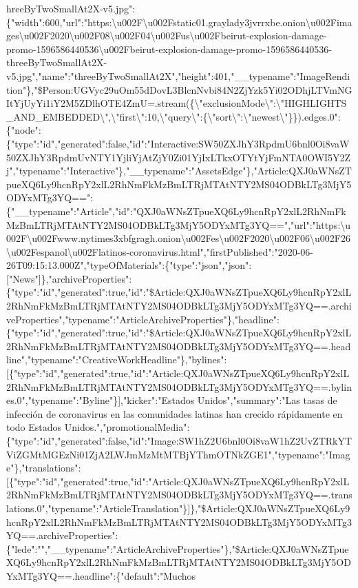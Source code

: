 hreeByTwoSmallAt2X-v5.jpg":\{"width":600,"url":"https:\textbackslash{}u002F\textbackslash{}u002Fstatic01.graylady3jvrrxbe.onion\textbackslash{}u002Fimages\textbackslash{}u002F2020\textbackslash{}u002F08\textbackslash{}u002F04\textbackslash{}u002Fus\textbackslash{}u002Fbeirut-explosion-damage-promo-1596586440536\textbackslash{}u002Fbeirut-explosion-damage-promo-1596586440536-threeByTwoSmallAt2X-v5.jpg","name":"threeByTwoSmallAt2X","height":401,"\_\_typename":"ImageRendition"\},"\$Person:UGVyc29uOm55dDovL3BlcnNvbi84N2ZjYzk5Yi02ODhjLTVmNGItYjUyYi1iY2M5ZDlhOTE4ZmU=.stream(\{\textbackslash{}"exclusionMode\textbackslash{}":\textbackslash{}"HIGHLIGHTS\_AND\_EMBEDDED\textbackslash{}",\textbackslash{}"first\textbackslash{}":10,\textbackslash{}"query\textbackslash{}":\{\textbackslash{}"sort\textbackslash{}":\textbackslash{}"newest\textbackslash{}"\}\}).edges.0":\{"node":\{"type":"id","generated":false,"id":"Interactive:SW50ZXJhY3RpdmU6bnl0Oi8vaW50ZXJhY3RpdmUvNTY1YjliYjAtZjY0Zi01YjIxLTkxOTYtYjFmNTA0OWI5Y2Zj","typename":"Interactive"\},"\_\_typename":"AssetsEdge"\},"Article:QXJ0aWNsZTpueXQ6Ly9hcnRpY2xlL2RhNmFkMzBmLTRjMTAtNTY2MS04ODBkLTg3MjY5ODYxMTg3YQ==":\{"\_\_typename":"Article","id":"QXJ0aWNsZTpueXQ6Ly9hcnRpY2xlL2RhNmFkMzBmLTRjMTAtNTY2MS04ODBkLTg3MjY5ODYxMTg3YQ==","url":"https:\textbackslash{}u002F\textbackslash{}u002Fwww.nytimes3xbfgragh.onion\textbackslash{}u002Fes\textbackslash{}u002F2020\textbackslash{}u002F06\textbackslash{}u002F26\textbackslash{}u002Fespanol\textbackslash{}u002Flatinos-coronavirus.html","firstPublished":"2020-06-26T09:15:13.000Z","typeOfMaterials":\{"type":"json","json":{[}"News"{]}\},"archiveProperties":\{"type":"id","generated":true,"id":"\$Article:QXJ0aWNsZTpueXQ6Ly9hcnRpY2xlL2RhNmFkMzBmLTRjMTAtNTY2MS04ODBkLTg3MjY5ODYxMTg3YQ==.archiveProperties","typename":"ArticleArchiveProperties"\},"headline":\{"type":"id","generated":true,"id":"\$Article:QXJ0aWNsZTpueXQ6Ly9hcnRpY2xlL2RhNmFkMzBmLTRjMTAtNTY2MS04ODBkLTg3MjY5ODYxMTg3YQ==.headline","typename":"CreativeWorkHeadline"\},"bylines":{[}\{"type":"id","generated":true,"id":"Article:QXJ0aWNsZTpueXQ6Ly9hcnRpY2xlL2RhNmFkMzBmLTRjMTAtNTY2MS04ODBkLTg3MjY5ODYxMTg3YQ==.bylines.0","typename":"Byline"\}{]},"kicker":"Estados
Unidos","summary":"Las tasas de infección de coronavirus en las
comunidades latinas han crecido rápidamente en todo Estados
Unidos.","promotionalMedia":\{"type":"id","generated":false,"id":"Image:SW1hZ2U6bnl0Oi8vaW1hZ2UvZTRkYTViZGMtMGEzNi01ZjA2LWJmMzMtMTBjYThmOTNkZGE1","typename":"Image"\},"translations":{[}\{"type":"id","generated":true,"id":"Article:QXJ0aWNsZTpueXQ6Ly9hcnRpY2xlL2RhNmFkMzBmLTRjMTAtNTY2MS04ODBkLTg3MjY5ODYxMTg3YQ==.translations.0","typename":"ArticleTranslation"\}{]}\},"\$Article:QXJ0aWNsZTpueXQ6Ly9hcnRpY2xlL2RhNmFkMzBmLTRjMTAtNTY2MS04ODBkLTg3MjY5ODYxMTg3YQ==.archiveProperties":\{"lede":"","\_\_typename":"ArticleArchiveProperties"\},"\$Article:QXJ0aWNsZTpueXQ6Ly9hcnRpY2xlL2RhNmFkMzBmLTRjMTAtNTY2MS04ODBkLTg3MjY5ODYxMTg3YQ==.headline":\{"default":"Muchos
